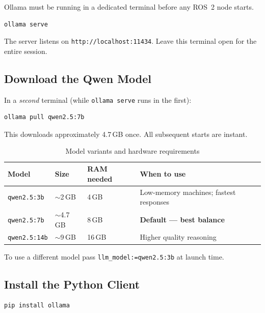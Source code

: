 \documentclass[12pt,a4paper]{report}
\begin{document}
Ollama must be running in a dedicated terminal before any ROS~2 node starts.

\begin{lstlisting}[style=bashstyle, caption={Start the Ollama inference server}]
ollama serve
\end{lstlisting}

The server listens on \texttt{http://localhost:11434}.
Leave this terminal open for the entire session.

\subsection{Download the Qwen Model}

In a \emph{second} terminal (while \texttt{ollama serve} runs in the first):

\begin{lstlisting}[style=bashstyle, caption={Pull the default model}]
ollama pull qwen2.5:7b
\end{lstlisting}

This downloads approximately 4.7\,GB once.
All subsequent starts are instant.

\begin{table}[H]
  \centering
  \caption{Model variants and hardware requirements}
  \begin{tabularx}{\linewidth}{L{3.5cm} L{2.5cm} L{3cm} X}
    \toprule
    \textbf{Model} & \textbf{Size} & \textbf{RAM needed} & \textbf{When to use} \\
    \midrule
    \texttt{qwen2.5:3b}  & $\sim$2\,GB  & 4\,GB  & Low-memory machines; fastest responses \\
    \texttt{qwen2.5:7b}  & $\sim$4.7\,GB & 8\,GB  & \textbf{Default --- best balance} \\
    \texttt{qwen2.5:14b} & $\sim$9\,GB  & 16\,GB & Higher quality reasoning \\
    \bottomrule
  \end{tabularx}
\end{table}

To use a different model pass \texttt{llm\_model:=qwen2.5:3b} at launch time.

\subsection{Install the Python Client}

\begin{lstlisting}[style=bashstyle]
pip install ollama
\end{lstlisting}
\end{document}
